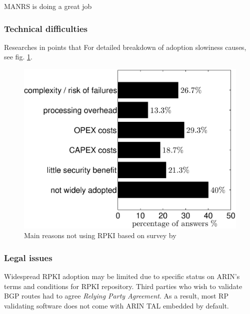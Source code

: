 MANRS is doing a great job\cite{Robachevsky2020}

\subsubsection{Technical difficulties}
Researches in \cite{Sermpezis2018} points that
 For detailed breakdown of adoption slowiness causes, see fig. \ref{fig:notrpkireasons}.


 \begin{figure}[h]
 	\begin{center}
\includegraphics[width = 1\linewidth]{./fig/fig_survey_reasons_rpki}
 	\end{center}
 	\caption{Main reasons not using RPKI based on survey by \cite{Sermpezis2018}} \label{fig:notrpkireasons}
 \end{figure}

\subsubsection{Legal issues}
Widespread RPKI adoption may be limited due to specific status on ARIN's terms and conditions for RPKI repository.
Third parties who wish to validate BGP routes had to agree \emph{Relying Party Agreement}.
As a result, most RP validating software does not come with ARIN TAL embedded by default.



